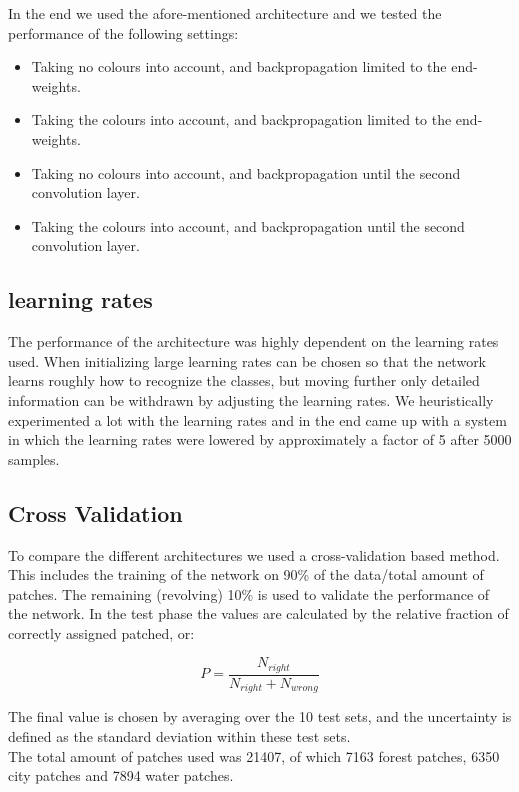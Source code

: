 \documentclass[a4paper,onecolumn]{report}
\begin{document}
In the end we used the afore-mentioned architecture and we tested the performance of the following settings: 
\begin{itemize}
\item Taking no colours into account, and backpropagation limited to the end-weights.
\item Taking the colours into account, and backpropagation limited to the end-weights.
\item Taking no colours into account, and backpropagation until the second convolution layer.
\item Taking the colours into account, and backpropagation until the second convolution layer. 
\end{itemize}


\subsection{learning rates}
The performance of the architecture was highly dependent on the learning rates used. When initializing large learning rates can be chosen so that the network learns roughly how to recognize the classes, but moving further only detailed information can be withdrawn by adjusting the learning rates. We heuristically experimented a lot with the learning rates and in the end came up with a system in which the learning rates were lowered by approximately a factor of 5 after 5000 samples. 

\subsection{Cross Validation}

To compare the different architectures we used a cross-validation based method. This includes the training of the network on 90\% of the data/total amount of patches. The remaining (revolving) 10\% is used to validate the performance of the network. In the test phase the values are calculated by the relative fraction of correctly assigned patched, or: 

\begin{equation}
\label{eq:P}
P= \frac{N_{right}}{N_{right}+ N_{wrong}}
\end{equation}

The final value is chosen by averaging over the 10 test sets, and the uncertainty is defined as the standard deviation within these test sets.\\

The total amount of patches used was 21407, of which 7163 forest patches, 6350 city patches and 7894 water patches. 
\end{document}
